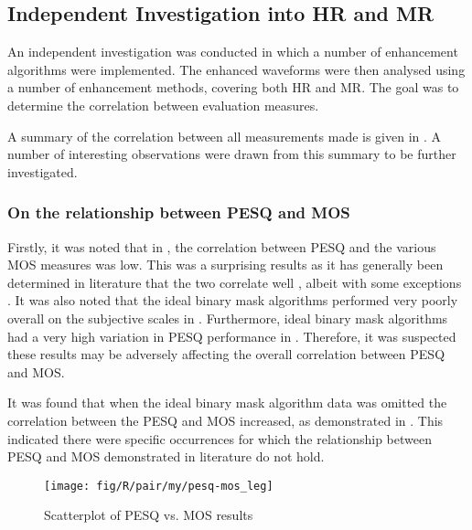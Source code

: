 \subsection{Independent Investigation into \acl{HR} and \acl{MR}}

An independent investigation was conducted in which a number of enhancement
algorithms were implemented. The enhanced waveforms were then analysed
using a number of enhancement methods, covering both \ac{HR} and
\ac{MR}. The goal was to determine the correlation between evaluation
measures.

A summary of the correlation between all measurements made is given
in . A number of interesting observations were drawn
from this summary to be further investigated.


\subsubsection*{On the relationship between \acs{PESQ} and \acs{MOS}}

Firstly, it was noted that in , the correlation between
\ac{PESQ} and the various \ac{MOS} measures was low. This was a
surprising results as it has generally been determined in literature
that the two correlate well \cite{Kitawaki2007,Rix2003,Rix2001},
albeit with some exceptions \cite{Liu2006}. It was also noted that
the ideal binary mask algorithms performed very poorly overall on
the subjective scales in .
Furthermore, ideal binary mask algorithms had a very high variation
in \ac{PESQ} performance in . Therefore, it was
suspected these results may be adversely affecting the overall correlation
between \ac{PESQ} and \ac{MOS}.

It was found that when the ideal binary mask algorithm data was omitted
the correlation between the \ac{PESQ} and \ac{MOS} increased, as
demonstrated in . This indicated there were specific
occurrences for which the relationship between \ac{PESQ} and \ac{MOS}
demonstrated in literature do not hold. 

\begin{figure}[h]

\texttt{[image: fig/R/pair/my/pesq-mos\_leg]}

\protect\caption{\label{fig:my-pesq-mos}Scatterplot of \acs{PESQ} vs. \acs{MOS}
results}
\end{figure}



